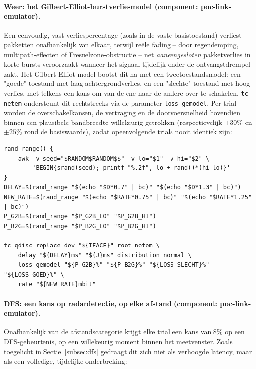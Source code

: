 \paragraph{Weer: het Gilbert-Elliot-burstverliesmodel (component: poc-link-emulator).}
Een eenvoudig, vast verliespercentage (zoals in de vaste basistoestand) verliest
pakketten onafhankelijk van elkaar, terwijl reële fading -- door regendemping,
multipath-effecten of Fresnelzone-obstructie -- net \emph{aaneengesloten} pakketverlies
in korte bursts veroorzaakt wanneer het signaal tijdelijk onder de ontvangstdrempel
zakt. Het Gilbert-Elliot-model bootst dit na met een tweetoestandsmodel: een "goede"
toestand met laag achtergrondverlies, en een "slechte" toestand met hoog verlies, met
telkens een kans om van de ene naar de andere over te schakelen. \texttt{tc netem}
ondersteunt dit rechtstreeks via de parameter \texttt{loss gemodel}. Per trial worden de
overschakelkansen, de vertraging en de doorvoersnelheid bovendien binnen een
plausibele bandbreedte willekeurig getrokken (respectievelijk $\pm 30\%$ en $\pm 25\%$
rond de basiswaarde), zodat opeenvolgende trials nooit identiek zijn:



\begin{listing}[h]
\begin{lstlisting}[style=bashstyle]
rand_range() {
    awk -v seed="$RANDOM$RANDOM$$" -v lo="$1" -v hi="$2" \
        'BEGIN{srand(seed); printf "%.2f", lo + rand()*(hi-lo)}'
}
DELAY=$(rand_range "$(echo "$D*0.7" | bc)" "$(echo "$D*1.3" | bc)")
NEW_RATE=$(rand_range "$(echo "$RATE*0.75" | bc)" "$(echo "$RATE*1.25" | bc)")
P_G2B=$(rand_range "$P_G2B_LO" "$P_G2B_HI")
P_B2G=$(rand_range "$P_B2G_LO" "$P_B2G_HI")

tc qdisc replace dev "${IFACE}" root netem \
    delay "${DELAY}ms" "${J}ms" distribution normal \
    loss gemodel "${P_G2B}%" "${P_B2G}%" "${LOSS_SLECHT}%" "${LOSS_GOED}%" \
    rate "${NEW_RATE}mbit"
\end{lstlisting}
\caption[Willekeurige weersvariatie]{Fragment uit \texttt{poc-run-trial.sh}: de
Gilbert-Elliot-parameters (\texttt{loss gemodel}: kans goed→slecht, kans slecht→goed,
verlies in slechte toestand, verlies in goede toestand) en de vertraging/doorvoersnelheid
worden per trial opnieuw willekeurig getrokken binnen de bandbreedte van de gekozen
afstandscategorie. Uitgevoerd op: \texttt{poc-link-emulator}.}
\label{lst:weer-variatie}
\end{listing}

\paragraph{DFS: een kans op radardetectie, op elke afstand (component:
poc-link-emulator).} Onafhankelijk van de afstandscategorie krijgt elke trial een kans
van 8\% op een DFS-gebeurtenis, op een willekeurig moment binnen het meetvenster. Zoals
toegelicht in Sectie~\ref{subsec:dfs} gedraagt dit zich niet als verhoogde latency, maar
als een volledige, tijdelijke onderbreking:




